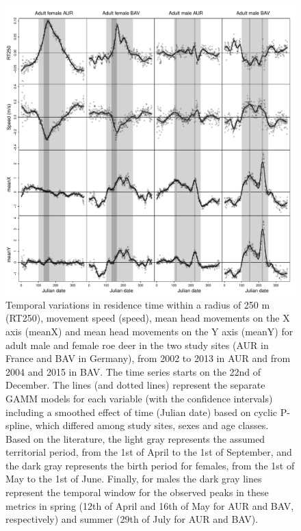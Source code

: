 \documentclass[a4paper,11pt]{article}
\begin{document}

\newpage
\begin{figure} [ht!]
  \centering
  \includegraphics[width=0.9\linewidth]{./figures/Fig2NB.pdf}
  \caption{Temporal variations in residence time within a radius of
    250 m (RT250), movement speed (speed), mean head movements on the
    X axis (meanX) and mean head movements on the Y axis (meanY) for
    adult male and female roe deer in the two study sites (AUR in
    France and BAV in Germany), from 2002 to 2013 in AUR and from 2004
    and 2015 in BAV. The time series starts on the 22nd of
    December. The lines (and dotted lines) represent the separate GAMM
    models for each variable (with the confidence intervals) including
    a smoothed effect of time (Julian date) based on cyclic P-spline,
    which differed among study sites, sexes and age classes. Based on
    the literature, the light gray represents the assumed territorial
    period, from the 1st of April to the 1st of September, and the
    dark gray represents the birth period for females, from the 1st of
    May to the 1st of June. Finally, for males the dark gray lines
    represent the temporal window for the observed peaks in these
    metrics in spring (12th of April and 16th of May for AUR and
    BAV, respectively) and summer (29th of July for AUR and BAV).}\label{fig:sex}
\end{figure}
\end{document}
